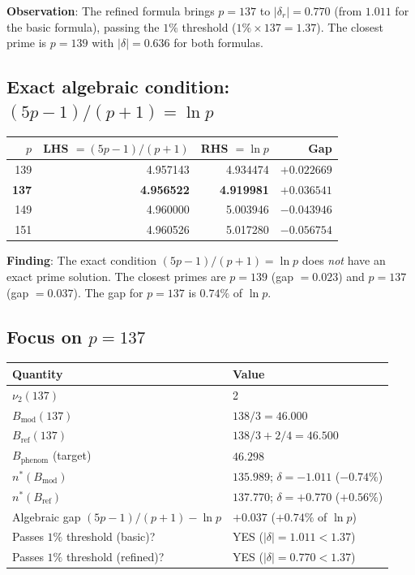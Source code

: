 \documentclass[12pt,a4paper]{article}
\theoremstyle{definition}
\theoremstyle{remark}
\begin{document}
\noindent\textbf{Observation}: The refined formula brings $p=137$ to
$|\delta_r| = 0.770$ (from $1.011$ for the basic formula), passing the
$1\%$ threshold ($1\% \times 137 = 1.37$).  The closest prime is $p=139$
with $|\delta| = 0.636$ for both formulas.

\subsection{Exact algebraic condition: $(5p-1)/(p+1) = \ln p$}

\begin{center}
\begin{tabular}{rrrr}
  \toprule
  $p$ & LHS $= (5p-1)/(p+1)$ & RHS $= \ln p$ & Gap \\
  \midrule
  139 & 4.957143 & 4.934474 & $+0.022669$ \\
  \textbf{137} & \textbf{4.956522} & \textbf{4.919981} & $+0.036541$ \\
  149 & 4.960000 & 5.003946 & $-0.043946$ \\
  151 & 4.960526 & 5.017280 & $-0.056754$ \\
  \bottomrule
\end{tabular}
\end{center}

\noindent\textbf{Finding}: The exact condition $(5p-1)/(p+1) = \ln p$ does
\emph{not} have an exact prime solution.  The closest primes are $p=139$
(gap $= 0.023$) and $p=137$ (gap $= 0.037$).  The gap for $p=137$ is
$0.74\%$ of $\ln p$.

\subsection{Focus on $p = 137$}

\begin{center}
\begin{tabular}{ll}
  \toprule
  Quantity & Value \\
  \midrule
  $\nu_2(137)$ & 2 \\
  $B_{\mathrm{mod}}(137)$ & $138/3 = 46.000$ \\
  $B_{\mathrm{ref}}(137)$ & $138/3 + 2/4 = 46.500$ \\
  $B_{\mathrm{phenom}}$ (target) & $46.298$ \\
  $n^*(B_{\mathrm{mod}})$ & $135.989$; $\delta = -1.011$ ($-0.74\%$) \\
  $n^*(B_{\mathrm{ref}})$ & $137.770$; $\delta = +0.770$ ($+0.56\%$) \\
  Algebraic gap $(5p-1)/(p+1) - \ln p$ & $+0.037$ ($+0.74\%$ of $\ln p$) \\
  Passes $1\%$ threshold (basic)? & YES ($|\delta|=1.011 < 1.37$) \\
  Passes $1\%$ threshold (refined)? & YES ($|\delta|=0.770 < 1.37$) \\
  \bottomrule
\end{tabular}
\end{center}
\end{document}
